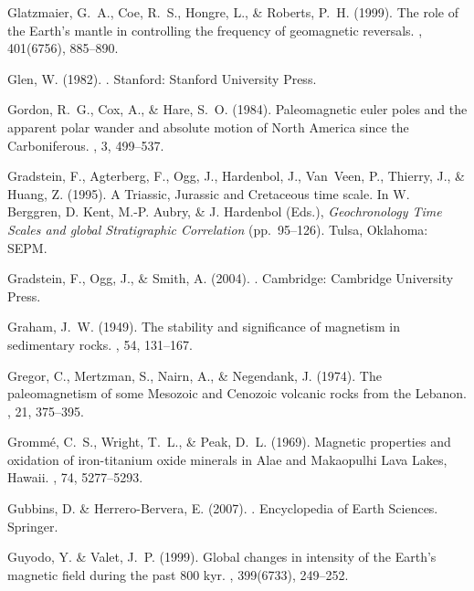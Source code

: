 \documentclass[11pt]{book}
\begin{document}
\begin{thebibliography}{}
Glatzmaier, G.~A., Coe, R.~S., Hongre, L., \& Roberts, P.~H. (1999).
\newblock The role of the Earth's mantle in controlling the frequency of
  geomagnetic reversals.
, 401(6756), 885--890.

Glen, W. (1982).
.
\newblock Stanford: Stanford University Press.

Gordon, R.~G., Cox, A., \& Hare, S.~O. (1984).
\newblock Paleomagnetic euler poles and the apparent polar wander and absolute
  motion of North America since the Carboniferous.
, 3, 499--537.

Gradstein, F., Agterberg, F., Ogg, J., Hardenbol, J., Van~Veen, P., Thierry,
  J., \& Huang, Z. (1995).
\newblock A Triassic, Jurassic and Cretaceous time scale.
\newblock In W. Berggren, D. Kent, M.-P. Aubry, \& J. Hardenbol (Eds.), {\em
  Geochronology Time Scales and global Stratigraphic Correlation}  (pp.\
  95--126). Tulsa, Oklahoma: SEPM.

Gradstein, F., Ogg, J., \& Smith, A. (2004).
.
\newblock Cambridge: Cambridge University Press.

Graham, J.~W. (1949).
\newblock The stability and significance of magnetism in sedimentary rocks.
\newblock {\em J. Geophys. Res.}, 54, 131--167.

Gregor, C., Mertzman, S., Nairn, A., \& Negendank, J. (1974).
\newblock The paleomagnetism of some Mesozoic and Cenozoic volcanic rocks from
  the Lebanon.
, 21, 375--395.

Gromm\'e, C.~S., Wright, T.~L., \& Peak, D.~L. (1969).
\newblock Magnetic properties and oxidation of iron-titanium oxide minerals in
  Alae and Makaopulhi Lava Lakes, Hawaii.
, 74, 5277--5293.

Gubbins, D. \& Herrero-Bervera, E. (2007).
.
\newblock Encyclopedia of Earth Sciences. Springer.

Guyodo, Y. \& Valet, J.~P. (1999).
\newblock Global changes in intensity of the Earth's magnetic field during the
  past 800 kyr.
, 399(6733), 249--252.


\end{thebibliography}
\end{document}
